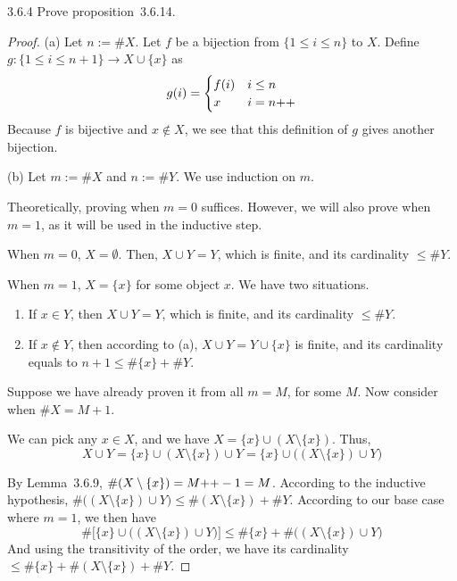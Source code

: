 \begin{exercise}{3.6.4}
	Prove proposition~3.6.14.
\end{exercise}
\begin{proof}\leavevmode

(a) 
	Let $n := \#X$. Let $f$ be a bijection from $\{1 \le i \le n\}$ to $X$. Define $g: \{1 \le i \le n+1\} \to X \cup \{x\}$ as 
	\[
		g(i) = 
		\begin{cases}
			f(i) &i \le n\\
			x &i = n{+}{+}
		\end{cases}
	\]
	Because $f$ is bijective and $x \notin X$, we see that this definition of $g$ gives another bijection.
	
(b)
	Let $m := \#X$ and $n := \#Y$. We use induction on $m$.
	
	\mybcbox Theoretically, proving when $m = 0$ suffices. However, we will also prove when $m = 1$, as it will be used in the inductive step.
	
	When $m = 0$, $X = \emptyset$. Then, $X \cup Y = Y$, which is finite, and its cardinality $\le \#Y$.
	
	When $m = 1$, $X = \{x\}$ for some object $x$. We have two situations.
	\begin{enumerate}
		\item If $x \in Y$, then $X \cup Y = Y$, which is finite, and its cardinality $\le \#Y$.
		\item If $x \notin Y$, then according to (a), $X \cup Y = Y \cup \{x\}$ is finite, and its cardinality equals to $n+1 \le \#\{x\} + \#Y$.
	\end{enumerate}

	\myisbox Suppose we have already proven it from all $m = M$, for some $M$. Now consider when $\#X = M+1$.
	
	We can pick any $x \in X$, and we have $X = \{x\} \cup (X \setminus \{x\})$. Thus,
	\[
		X \cup Y = \{x\} \cup (X \setminus \{x\}) \cup Y = \{x\} \cup \bigl((X \setminus \{x\}) \cup Y\bigr)
	\]
	
	By Lemma~3.6.9, $\#(X \setminus \{x\}) = M{+}{+}-1 = M$. According to the inductive hypothesis, $\#\bigl((X \setminus \{x\}) \cup Y\bigr) \le \#(X \setminus \{x\}) + \#Y$. According to our base case where $m = 1$, we then have 
	\[
		\#\biggl[\{x\} \cup \bigl((X \setminus \{x\}) \cup Y\bigr)\biggr] \le \#\{x\} + \#\bigl((X \setminus \{x\}) \cup Y\bigr)
	\]
	And using the transitivity of the order, we have its cardinality $\le \#\{x\} + \#(X \setminus \{x\}) + \#Y$.
	

\end{proof}
